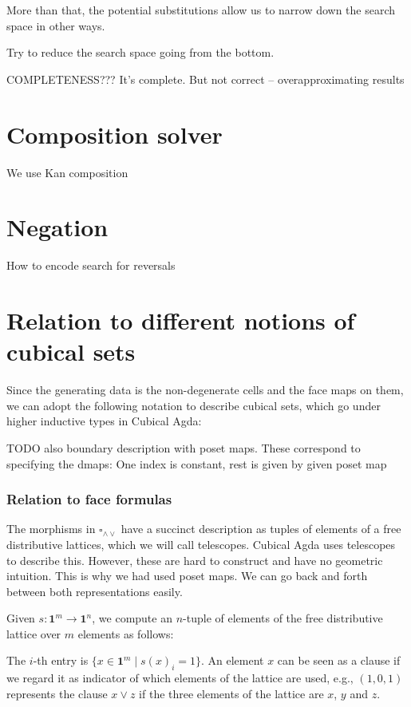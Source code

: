 \documentclass[11pt]{article}
\theoremstyle{definition}
\newcommand{\join}{\wedge}
\newcommand{\meet}{\vee}
\newcommand{\dedekind}{\square_{\join \meet}}
\newcommand{\pint}[1]{\mathbf{1}^{#1}}
\begin{document}
More than that, the potential substitutions allow us to narrow down the search
space in other ways.

Try to reduce the search space going from the bottom.

COMPLETENESS???
It's complete. But not correct -- overapproximating results





\section{Composition solver}

We use Kan composition



\section{Negation}

How to encode search for reversals


\section{Relation to different notions of cubical sets}

Since the generating data is the non-degenerate cells and the face maps on them,
we can adopt the following notation to describe cubical sets, which go under
higher inductive types in Cubical Agda:

TODO also boundary description with poset maps. These correspond to specifying
the dmaps: One index is constant, rest is given by given poset map


\subsubsection{Relation to face formulas}

The morphisms in $\dedekind$ have a succinct description as tuples of elements of a free
distributive lattices, which we will call telescopes.
Cubical Agda uses telescopes to describe this. However, these are hard to
construct and have no geometric intuition. This is why we had used poset maps.
We can go back and forth between both representations easily.


Given $s : \pint{m} \to \pint{n}$, we compute an $n$-tuple of elements of the
free distributive lattice over $m$ elements as follows:

The $i$-th entry is $\{ x \in \pint{m} \mid s(x)_i = 1 \}$. An element $x$ can be
seen as a clause if we regard it as indicator of which elements of the lattice
are used, e.g., $(1,0,1)$ represents the clause $x \meet z$ if the three
elements of the lattice are $x$, $y$ and $z$.
\end{document}
